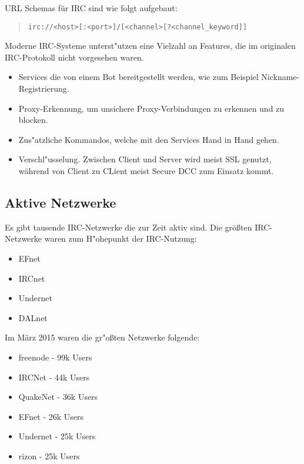 URL Schemas für IRC sind wie folgt aufgebaut:
\begin{quote}
\verb|irc://<host>[:<port>]/[<channel>[?<channel_keyword]]|
\end{quote}
Moderne IRC-Systeme unterst"utzen eine Vielzahl an Features, die im originalen IRC-Protokoll nicht vorgesehen waren.
\begin{itemize}
\item Services die von einem Bot bereitgestellt werden, wie zum Beispiel Nickname-Registrierung.
\item Proxy-Erkennung, um unsichere Proxy-Verbindungen zu erkennen und zu blocken.
\item Zus"atzliche Kommandos, welche mit den Services Hand in Hand gehen.
\item Verschl"usselung. Zwischen Client und Server wird meist SSL genutzt, während von Client zu CLient meist Secure DCC zum Einsatz kommt.
\end{itemize}
\subsection{Aktive Netzwerke}
Es gibt tausende IRC-Netzwerke die zur Zeit aktiv sind. Die größten IRC-Netzwerke waren zum H"ohepunkt der IRC-Nutzung:
\begin{itemize}
\item EFnet
\item IRCnet
\item Undernet
\item DALnet
\end{itemize}
Im März 2015 waren die gr"oßten Netzwerke folgende:
\begin{itemize}
\item freenode - 99k Users
\item IRCNet - 44k Users
\item QuakeNet - 36k Users
\item EFnet - 26k Users
\item Undernet - 25k Users
\item rizon - 25k Users
\end{itemize}

